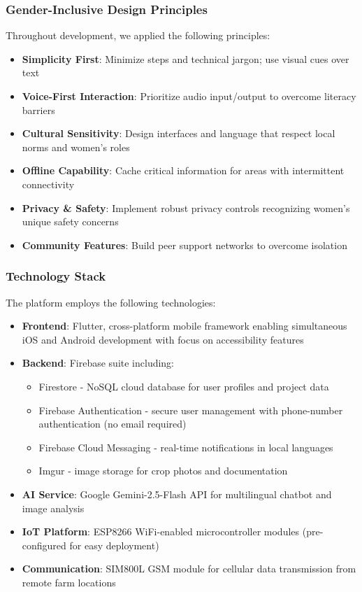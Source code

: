 \documentclass[9pt,twocolumn,twoside]{article}
\begin{document}
\subsubsection{Gender-Inclusive Design Principles}

Throughout development, we applied the following principles:
\begin{itemize}
\item \textbf{Simplicity First}: Minimize steps and technical jargon; use visual cues over text
\item \textbf{Voice-First Interaction}: Prioritize audio input/output to overcome literacy barriers
\item \textbf{Cultural Sensitivity}: Design interfaces and language that respect local norms and women's roles
\item \textbf{Offline Capability}: Cache critical information for areas with intermittent connectivity
\item \textbf{Privacy \& Safety}: Implement robust privacy controls recognizing women's unique safety concerns
\item \textbf{Community Features}: Build peer support networks to overcome isolation
\end{itemize}

\subsubsection{Technology Stack}
The platform employs the following technologies:
\begin{itemize}
\item \textbf{Frontend}: Flutter, cross-platform mobile framework enabling simultaneous iOS and Android development with focus on accessibility features
\item \textbf{Backend}: Firebase suite including:
\begin{itemize}
\item Firestore - NoSQL cloud database for user profiles and project data
\item Firebase Authentication - secure user management with phone-number authentication (no email required)
\item Firebase Cloud Messaging - real-time notifications in local languages
\item Imgur - image storage for crop photos and documentation
\end{itemize}
\item \textbf{AI Service}: Google Gemini-2.5-Flash API for multilingual chatbot and image analysis
\item \textbf{IoT Platform}: ESP8266 WiFi-enabled microcontroller modules (pre-configured for easy deployment)
\item \textbf{Communication}: SIM800L GSM module for cellular data transmission from remote farm locations
\end{itemize}
\end{document}
